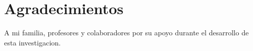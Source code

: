 \chapter*{Agradecimientos}

A mi familia, profesores y colaboradores por su apoyo durante el desarrollo de esta investigacion.
